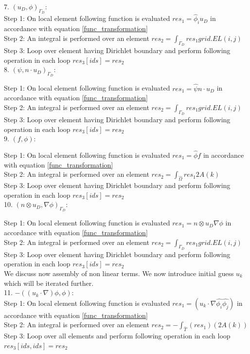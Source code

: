 \documentclass[a4paper,12pt]{book}
\begin{document}
7. $(u_D,\phi)_{\Gamma_D}$:
\\

Step 1: On local element following function is evaluated $res_1=\hat{\phi}_i u_D$ in accordance with equation \ref{func_transformation}\\
Step 2: An integral is performed over an element $res_2=\int_{\Gamma_D} res_1 grid.EL(i,j) $\\
Step 3: Loop over element having Dirichlet boundary and perform following operation in each loop $res_3[ids]=res_2$\\

8. $(\psi, n \cdot u_D)_{\Gamma_D} $:

Step 1: On local element following function is evaluated $res_1=\hat{\psi} n\cdot u_D$ in accordance with equation \ref{func_transformation}\\
Step 2: An integral is performed over an element $res_2=\int_{\Gamma_D} res_1 grid.EL(i,j) $\\
Step 3: Loop over element having Dirichlet boundary and perform following operation in each loop $res_3[ids]=res_2$\\

9. $(f,\phi) $:

Step 1: On local element following function is evaluated $res_1= \hat{\phi} f$ in accordance with equation \ref{func_transformation}\\
Step 2: An integral is performed over an element $res_2=\int_{\hat{\Omega}} res_1 2 A(k)$\\
Step 3: Loop over element having Dirichlet boundary and perform following operation in each loop $res_3[ids]=res_2$\\


10. $(n \otimes u_D,\nabla \phi)_{\Gamma_D} $:

Step 1: On local element following function is evaluated $res_1= n \otimes u_D  \nabla \phi$ in accordance with equation \ref{func_transformation}\\
Step 2: An integral is performed over an element $res_2=\int_{\Gamma_D} res_1 grid.EL(i,j)$\\
Step 3: Loop over element having Dirichlet boundary and perform following operation in each loop $res_3[ids]=res_2$\\

We discuss now assembly of non linear terms. We now introduce initial guess $u_k$ which will be iterated further.\\

11. $-((u_k \cdot \nabla)\phi , \phi)$:\\
Step 1: On local element following function is evaluated $res_1 = (u_k \cdot \nabla \hat{\phi_i} \hat{\phi_j}) $ in accordance with equation \ref{func_transformation}\\
Step 2: An integral is performed over an element $res_2= - \int_{\hat{T}} (res_1) (2A(k))$\\
Step 3: Loop over all elements and perform following operation in each loop $res_3[ids,ids]=res_2$\\
\end{document}
